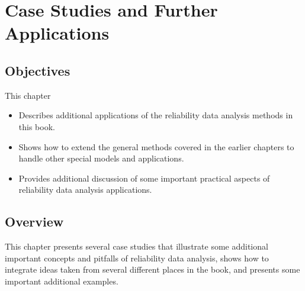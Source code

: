 \setcounter{chapter}{21}


\chapter{Case Studies and Further Applications}
\label{chapter:case.studies}



\section*{Objectives}
This chapter 
\begin{itemize} 
\item 
Describes additional applications of the
reliability data analysis methods in this book.
\item 
Shows how to extend the general methods covered in the earlier
chapters to handle other special models and applications.
\item 
Provides additional discussion of some important practical aspects of
reliability data analysis applications.
\end{itemize}

\section*{Overview}
This chapter presents several case studies that illustrate some
additional important concepts and pitfalls of reliability data
analysis, shows how to integrate ideas taken from several different
places in the book, and presents some important additional examples.

